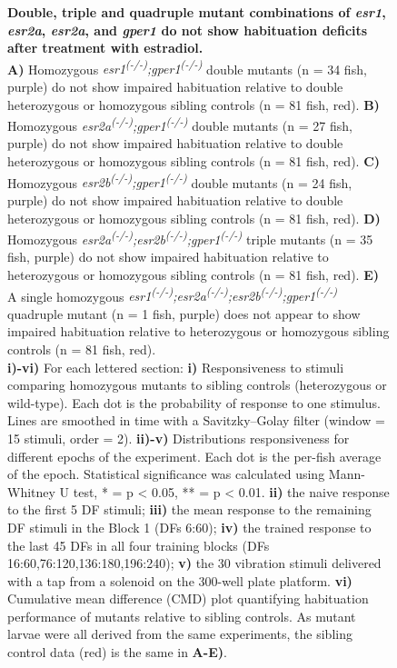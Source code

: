 \documentclass[9.5pt,lineno]{RandlettLab_elife}
\begin{document}
{\begin{figure}
\begin{center}
\end{center}
\endinternallinenumbers
\end{figure}


\begin{figure}
\internallinenumbers

\begin{center}

\caption{ \textbf{Double, triple and quadruple mutant combinations of \emph{esr1}, \emph{esr2a}, \emph{esr2a}, and \emph{gper1} do not show habituation deficits after treatment with estradiol.} \doublespacing
\\ \textbf{A)} Homozygous \emph{esr1\textsuperscript{(-/-)};gper1\textsuperscript{(-/-)}} double mutants (n = 34 fish, purple) do not show impaired habituation relative to double heterozygous or homozygous sibling controls (n = 81 fish, red). 
\textbf{B)} Homozygous \emph{esr2a\textsuperscript{(-/-)};gper1\textsuperscript{(-/-)}} double mutants (n = 27 fish, purple) do not show impaired habituation relative to double heterozygous or homozygous sibling controls (n = 81 fish, red). 
\textbf{C)} Homozygous \emph{esr2b\textsuperscript{(-/-)};gper1\textsuperscript{(-/-)}} double mutants (n = 24 fish, purple) do not show impaired habituation relative to double heterozygous or homozygous sibling controls (n = 81 fish, red). 
\textbf{D)} Homozygous \emph{esr2a\textsuperscript{(-/-)};esr2b\textsuperscript{(-/-)};gper1\textsuperscript{(-/-)}} triple mutants (n = 35 fish, purple) do not show impaired habituation relative to heterozygous or homozygous sibling controls (n = 81 fish, red). 
\textbf{E)} A single homozygous \emph{esr1\textsuperscript{(-/-)};esr2a\textsuperscript{(-/-)};esr2b\textsuperscript{(-/-)};gper1\textsuperscript{(-/-)}} quadruple mutant (n = 1 fish, purple) does not appear to show impaired habituation relative to heterozygous or homozygous sibling controls (n = 81 fish, red). 
\\ \textbf{i)-vi)} For each lettered section: 
\textbf{i)} Responsiveness to stimuli comparing homozygous mutants to sibling controls (heterozygous or wild-type). 
Each dot is the probability of response to one stimulus. Lines are smoothed in time with a Savitzky–Golay filter (window = 15 stimuli, order = 2).
\textbf{ii)-v)} Distributions responsiveness for different epochs of the experiment. Each dot is the per-fish average of the epoch. 
Statistical significance was calculated using Mann-Whitney U test, * = p < 0.05, ** = p < 0.01.
\textbf{ii)} the naive response to the first 5 DF stimuli; \textbf{iii)} the mean response to the remaining DF stimuli in the Block 1 (DFs 6:60); \textbf{iv)} the trained response to the last 45 DFs in all four training blocks (DFs 16:60,76:120,136:180,196:240); \textbf{v)} the 30 vibration stimuli delivered with a tap from a solenoid on the 300-well plate platform.
\textbf{vi)} Cumulative mean difference (CMD) plot quantifying habituation performance of mutants relative to sibling controls. 
As mutant larvae were all derived from the same experiments, the sibling control data (red) is the same in \textbf{A-E)}.
}



\end{center}
\end{figure}}
\end{document}

